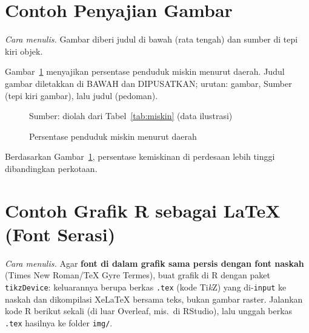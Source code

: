 \section{Contoh Penyajian Gambar}
\emph{Cara menulis.} Gambar diberi judul di bawah (rata tengah) dan sumber di tepi kiri objek.

Gambar~\ref{gbr:bar} menyajikan persentase penduduk miskin menurut daerah. Judul
gambar diletakkan di BAWAH dan DIPUSATKAN; urutan: gambar, Sumber (tepi kiri gambar), lalu judul (pedoman).

\begin{figure}[H]
\centering
\sbox{}%
\usebox\skripsiblokbox\par
\addvspace{0.4\spasi}
\parbox[t]{\wd\skripsiblokbox}{\raggedright\setlength{\parindent}{0pt}\small Sumber: diolah dari Tabel~\ref{tab:miskin} (data ilustrasi)}\par
\caption{Persentase penduduk miskin menurut daerah}
\label{gbr:bar}
\end{figure}

Berdasarkan Gambar~\ref{gbr:bar}, persentase kemiskinan di perdesaan lebih tinggi
dibandingkan perkotaan.

\section{Contoh Grafik R sebagai LaTeX (Font Serasi)}
\emph{Cara menulis.} Agar \textbf{font di dalam grafik sama persis dengan font naskah}
(Times New Roman/TeX Gyre Termes), buat grafik di R dengan paket \texttt{tikzDevice}:
keluarannya berupa berkas \texttt{.tex} (kode Ti\emph{k}Z) yang di-\texttt{input} ke
naskah dan dikompilasi XeLaTeX bersama teks, bukan gambar raster. Jalankan kode R
berikut sekali (di luar Overleaf, mis.\ di RStudio), lalu unggah berkas \texttt{.tex}
hasilnya ke folder \texttt{img/}.

